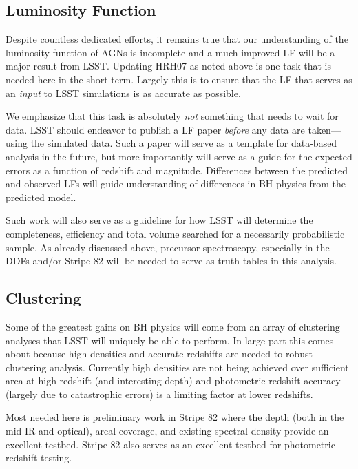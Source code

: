 \subsection{Luminosity Function}

Despite countless dedicated efforts, it remains true that our understanding of the luminosity function of AGNs is incomplete and a much-improved LF will be a major result from LSST.  Updating HRH07 as noted above is one task that is needed here in the short-term.  Largely this is to ensure that the LF that serves as an {\em input} to LSST simulations is as accurate as possible.

We emphasize that this task is absolutely {\em not} something that needs to wait for data.  LSST should endeavor to publish a LF paper {\em before} any data are taken---using the simulated data.  Such a paper will serve as a template for data-based analysis in the future, but more importantly will serve as a guide for the expected errors as a function of redshift and magnitude.  Differences between the predicted and observed LFs will guide understanding of differences in BH physics from the predicted model.

Such work will also serve as a guideline for how LSST will determine the completeness, efficiency and total volume searched for a necessarily probabilistic sample.  As already discussed above, precursor spectroscopy, especially in the DDFs and/or Stripe 82 will be needed to serve as truth tables in this analysis.

\subsection{Clustering}

Some of the greatest gains on BH physics will come from an array of clustering analyses that LSST will uniquely be able to perform.  In large part this comes about because high densities and accurate redshifts are needed to robust clustering analysis.  Currently high densities are not being achieved over sufficient area at high redshift (and interesting depth) and photometric redshift accuracy (largely due to catastrophic errors) is a limiting factor at lower redshifts.  

Most needed here is preliminary work in Stripe 82 where the depth (both in the mid-IR and optical), areal coverage, and existing spectral density provide an excellent testbed.  Stripe 82 also serves as an excellent testbed for photometric redshift testing.

